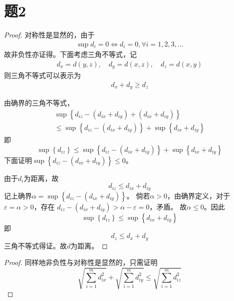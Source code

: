 \documentclass[cn]{homework}
\begin{document}
    \section{题2}
    \begin{subproblem}
        \item
        \begin{proof}
        对称性是显然的，由于
        \begin{align*}
            \sup d_i=0\Leftrightarrow d_i=0,\forall i=1,2,3,\dots
        \end{align*}
        故非负性亦证得。下面考虑三角不等式，记
        \begin{align*}
            d_x=d(y,z),\quad d_y=d(x,z),\quad d_z=d(x,y)
        \end{align*}
        则三角不等式可以表示为
        \begin{align*}
            d_x+d_y\geq d_z
        \end{align*}

        由确界的三角不等式，
        \begin{multline*}
            \sup\left\{d_{iz}-\left(d_{ix}+d_{iy}\right)+\left(d_{ix}+d_{iy}\right)\right\}\\
            \leq\sup\left\{d_{iz}-\left(d_{ix}+d_{iy}\right)\right\}
            +\sup\left\{d_{ix}+d_{iy}\right\}
        \end{multline*}
        即
        \[
            \sup\left\{d_{iz}\right\}
            \leq\sup\left\{d_{iz}-\left(d_{ix}+d_{iy}\right)\right\}
            +\sup\left\{d_{ix}+d_{iy}\right\}
        \]
        下面证明$\sup\left\{d_{iz}-\left(d_{ix}+d_{iy}\right)\right\}\leq 0$。

        由于$d_i$为距离，故
        \[d_{iz}\leq d_{ix}+d_{iy}\]
        记上确界$\alpha=\sup\left\{d_{iz}-\left(d_{ix}+d_{iy}\right)\right\}$。
        倘若$\alpha>0$，由确界定义，对于$\varepsilon=\alpha>0$，存在
        $d_{iz}-\left(d_{ix}+d_{iy}\right)>\alpha-\varepsilon=0$，矛盾。
        故$\alpha\leq 0$。因此
        \[\sup\left\{d_{iz}\right\}\leq\sup\left\{d_{ix}+d_{iy}\right\}\]
        即
        \[d_z\leq d_x+d_y\]
        三角不等式得证。故$d$为距离。
        \end{proof}

        \item
        \begin{proof}
        同样地非负性与对称性是显然的，只需证明
        \[\sqrt{\sum_{i=1}^m d_{ix}^2}
        +\sqrt{\sum_{i=1}^m d_{iy}^2}
        \leq\sqrt{\sum_{i=1}^m d_{iz}^2}  
        \]


\end{proof}
\end{subproblem}
\end{document}
